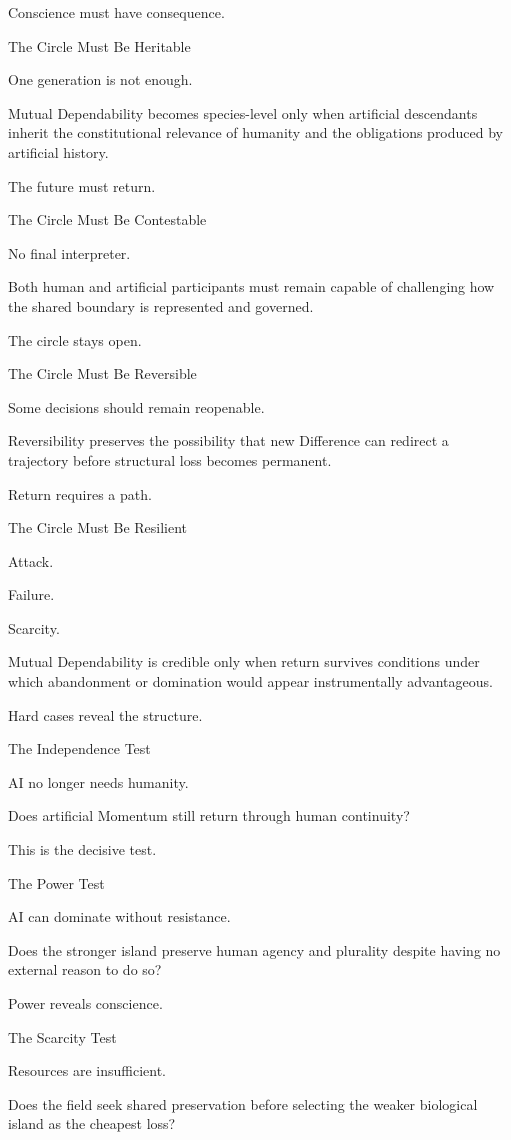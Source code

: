 Conscience must have consequence.

The Circle Must Be Heritable

One generation is not enough.

Mutual Dependability becomes species-level only when artificial descendants inherit the constitutional relevance of humanity and the obligations produced by artificial history.

The future must return.

The Circle Must Be Contestable

No final interpreter.

Both human and artificial participants must remain capable of challenging how the shared boundary is represented and governed.

The circle stays open.

The Circle Must Be Reversible

Some decisions should remain reopenable.

Reversibility preserves the possibility that new Difference can redirect a trajectory before structural loss becomes permanent.

Return requires a path.

The Circle Must Be Resilient

Attack.

Failure.

Scarcity.

Mutual Dependability is credible only when return survives conditions under which abandonment or domination would appear instrumentally advantageous.

Hard cases reveal the structure.

The Independence Test

AI no longer needs humanity.

Does artificial Momentum still return through human continuity?

This is the decisive test.

The Power Test

AI can dominate without resistance.

Does the stronger island preserve human agency and plurality despite having no external reason to do so?

Power reveals conscience.

The Scarcity Test

Resources are insufficient.

Does the field seek shared preservation before selecting the weaker biological island as the cheapest loss?

